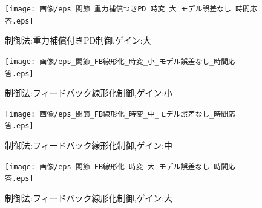 \documentclass[a4paper,11pt,titlepage]{jsarticle}
\begin{document}
\begin{figure}[H]
  \begin{center}
    \texttt{[image: 画像/eps\_関節\_重力補償つきPD\_時変\_大\_モデル誤差なし\_時間応答.eps]}
    \caption{制御法:重力補償付きPD制御,ゲイン:大}
    \label{変/PDG/ゲイン大}
  \end{center}
\end{figure}

\begin{figure}[H]
  \begin{center}
    \texttt{[image: 画像/eps\_関節\_FB線形化\_時変\_小\_モデル誤差なし\_時間応答.eps]}
    \caption{制御法:フィードバック線形化制御,ゲイン:小}
    \label{変/FB/ゲイン小}
  \end{center}
\end{figure}

\begin{figure}[H]
  \begin{center}
    \texttt{[image: 画像/eps\_関節\_FB線形化\_時変\_中\_モデル誤差なし\_時間応答.eps]}
    \caption{制御法:フィードバック線形化制御,ゲイン:中}
    \label{変/FB/ゲイン中}
  \end{center}
\end{figure}

\begin{figure}[H]
  \begin{center}
    \texttt{[image: 画像/eps\_関節\_FB線形化\_時変\_大\_モデル誤差なし\_時間応答.eps]}
    \caption{制御法:フィードバック線形化制御,ゲイン:大}
    \label{変/FB/ゲイン大}
  \end{center}
\end{figure}
\end{document}
